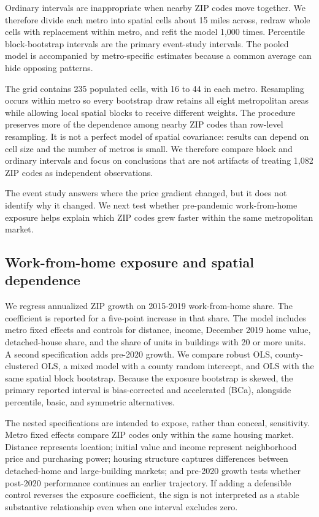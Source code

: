 \documentclass[11pt]{article}
\begin{document}
Ordinary intervals are inappropriate when nearby ZIP codes move together. We therefore divide each metro into spatial cells about
15 miles across, redraw whole cells with replacement within metro, and refit the model 1,000 times. Percentile block-bootstrap
intervals are the primary event-study intervals. The pooled model is accompanied by metro-specific estimates because a common
average can hide opposing patterns.

The grid contains 235 populated cells, with 16 to 44 in each metro. Resampling occurs within metro so every bootstrap draw retains
all eight metropolitan areas while allowing local spatial blocks to receive different weights. The procedure preserves more of
the dependence among nearby ZIP codes than row-level resampling. It is not a perfect model of spatial covariance: results can
depend on cell size and the number of metros is small. We therefore compare block and ordinary intervals and focus on conclusions
that are not artifacts of treating 1,082 ZIP codes as independent observations.

The event study answers where the price gradient changed, but it does not identify why it changed. We next test whether
pre-pandemic work-from-home exposure helps explain which ZIP codes grew faster within the same metropolitan market.

\subsection{Work-from-home exposure and spatial dependence}
\label{sec:exposure}

We regress annualized ZIP growth on 2015-2019 work-from-home share. The coefficient is reported for a five-point increase in that
share. The model includes metro fixed effects and controls for distance, income, December 2019 home value, detached-house share,
and the share of units in buildings with 20 or more units. A second specification adds pre-2020 growth. We compare robust OLS,
county-clustered OLS, a mixed model with a county random intercept, and OLS with the same spatial block bootstrap. Because the
exposure bootstrap is skewed, the primary reported interval is bias-corrected and accelerated (BCa), alongside percentile, basic,
and symmetric alternatives.

The nested specifications are intended to expose, rather than conceal, sensitivity. Metro fixed effects compare ZIP codes only
within the same housing market. Distance represents location; initial value and income represent neighborhood price and purchasing
power; housing structure captures differences between detached-home and large-building markets; and pre-2020 growth tests whether
post-2020 performance continues an earlier trajectory. If adding a defensible control reverses the exposure coefficient, the sign
is not interpreted as a stable substantive relationship even when one interval excludes zero.
\end{document}
